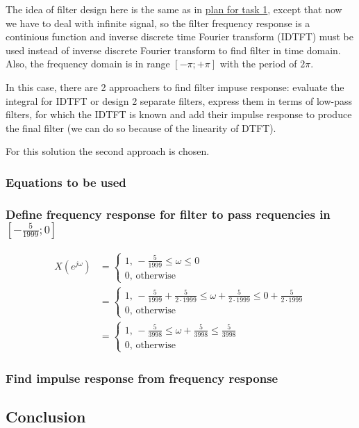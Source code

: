 \documentclass[a4paper]{article}
\theoremstyle{break}
\theoremstyle{break}
\begin{document}
The idea of filter design here is the same as in \hyperref[subsub:task_1_plan]{plan for task 1}, except that now we have to deal with infinite signal, so the filter frequency response is a continious function and inverse discrete time Fourier transform (IDTFT) must be used instead of inverse discrete Fourier transform to find filter in time domain. Also, the frequency domain is in range $\left[ -\pi; + \pi \right]$ with the period of $2 \pi$.

In this case, there are 2 approachers to find filter impuse response: evaluate the integral for IDTFT or design 2 separate filters, express them in terms of low-pass filters, for which the IDTFT is known and add their impulse response to produce the final filter (we can do so because of the linearity of DTFT).

For this solution the second approach is chosen.

\subsubsection*{Equations to be used}


\subsubsection*{Define frequency response for filter to pass requencies in $\left[ -\frac{5}{1999}; 0 \right]$}

\begin{equation*}
  \begin{split}
    X(e^{j \omega}) &= \begin{cases}
                         1, \, -\frac{5}{1999} \leq \omega \leq 0 \\
                         0, \, \text{otherwise}
                       \end{cases} \\
                    &= \begin{cases}
                         1, \, -\frac{5}{1999} + \frac{5}{2 \cdot 1999} \leq \omega + \frac{5}{2 \cdot 1999} \leq 0 + \frac{5}{2 \cdot 1999} \\
                         0, \, \text{otherwise}
                       \end{cases} \\
                    &= \begin{cases}
                         1, \, -\frac{5}{3998} \leq \omega + \frac{5}{3998} \leq \frac{5}{3998} \\
                         0, \, \text{otherwise}
                       \end{cases}
  \end{split}
\end{equation*}

\subsubsection*{Find impulse response from frequency response}


\subsection*{Conclusion}

\end{document}

